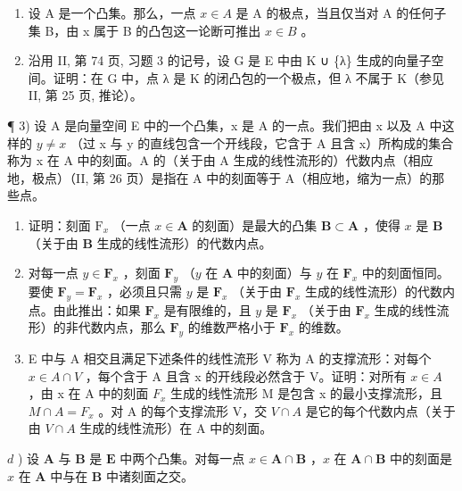 \exercisegroup

\begin{enumerate}
\def\labelenumi{\arabic{enumi})}
\item
  设 A 是一个凸集。那么，一点 \(x \in A\) 是 A 的极点，当且仅当对 A 的任何子集 B，由 x 属于 B 的凸包这一论断可推出 \(x \in B\) 。
\item
  沿用 II, 第 74 页, 习题 3 的记号，设 G 是 E 中由 K ∪ \{λ\} 生成的向量子空间。证明：在 G 中，点 λ 是 K 的闭凸包的一个极点，但 λ 不属于 K（参见 II, 第 25 页, 推论）。
\end{enumerate}

¶ 3) 设 A 是向量空间 E 中的一个凸集，x 是 A 的一点。我们把由 x 以及 A 中这样的 \(y \neq x\) （过 x 与 y 的直线包含一个开线段，它含于 A 且含 x）所构成的集合称为 x 在 A 中的刻面。A 的（关于由 A 生成的线性流形的）代数内点（相应地，极点）（II, 第 26 页）是指在 A 中的刻面等于 A（相应地，缩为一点）的那些点。

\begin{enumerate}
\def\labelenumi{\alph{enumi})}
\item
  证明：刻面 \(\mathrm{F}_x\) （一点 \(x \in \mathbf{A}\) 的刻面）是最大的凸集 \(\mathbf{B} \subset \mathbf{A}\) ，使得 \(x\) 是 \(\mathbf{B}\) （关于由 \(\mathbf{B}\) 生成的线性流形）的代数内点。
\item
  对每一点 \(y \in \mathbf{F}_x\) ，刻面 \(\mathbf{F}_y\) （\(y\) 在 \(\mathbf{A}\) 中的刻面）与 \(y\) 在 \(\mathbf{F}_x\) 中的刻面恒同。要使 \(\mathbf{F}_y = \mathbf{F}_x\) ，必须且只需 \(y\) 是 \(\mathbf{F}_x\) （关于由 \(\mathbf{F}_x\) 生成的线性流形）的代数内点。由此推出：如果 \(\mathbf{F}_x\) 是有限维的，且 \(y\) 是 \(\mathbf{F}_x\) （关于由 \(\mathbf{F}_x\) 生成的线性流形）的非代数内点，那么 \(\mathbf{F}_y\) 的维数严格小于 \(\mathbf{F}_x\) 的维数。
\item
  E 中与 A 相交且满足下述条件的线性流形 V 称为 A 的支撑流形：对每个 \(x \in A \cap V\) ，每个含于 A 且含 x 的开线段必然含于 V。证明：对所有 \(x \in A\) ，由 x 在 A 中的刻面 \(F_{x}\) 生成的线性流形 M 是包含 x 的最小支撑流形，且 \(M \cap A = F_{x}\) 。对 A 的每个支撑流形 V，交 \(V \cap A\) 是它的每个代数内点（关于由 \(V \cap A\) 生成的线性流形）在 A 中的刻面。
\end{enumerate}

\(d\) ) 设 \(\mathbf{A}\) 与 \(\mathbf{B}\) 是 \(\mathbf{E}\) 中两个凸集。对每一点 \(x\in \mathbf{A}\cap \mathbf{B}\) ，\(x\) 在 \(\mathbf{A}\cap \mathbf{B}\) 中的刻面是 \(x\) 在 \(\mathbf{A}\) 中与在 \(\mathbf{B}\) 中诸刻面之交。

